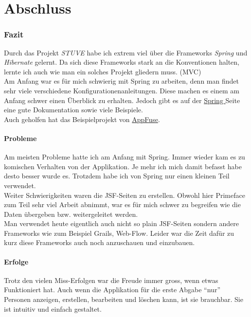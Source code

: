 \part{Abschluss}
\newpage
\section{Fazit}
Durch das Projekt \textit{STUVE} habe ich extrem viel über die Frameworks \textit{Spring} und \textit{Hibernate} gelernt. Da sich diese Frameworks stark an die Konventionen halten, lernte ich auch wie man ein solches Projekt gliedern muss. (MVC)\\[2ex]
Am Anfang war es für mich schwierig mit Spring zu arbeiten, denn man findet sehr viele verschiedene Konfigurationenanleitungen. Diese machen es einem am Anfang schwer einen Überblick zu erhalten. Jedoch gibt es auf der \href{http://www.springsource.org/}{Spring }Seite eine gute Dokumentation sowie viele Beispiele.\\
Auch geholfen hat das Beispielprojekt von \href{http://appfuse.org/display/APF/Home}{AppFuse}.\\
%
\subsection{Probleme}
Am meisten Probleme hatte ich am Anfang mit Spring. Immer wieder kam es zu komischen Verhalten von der Applikation. Je mehr ich mich damit befasst habe desto besser wurde es. Trotzdem habe ich von Spring nur einen kleinen Teil verwendet.\\
Weiter Schwierigkeiten waren die JSF-Seiten zu erstellen. Obwohl hier Primeface zum Teil sehr viel Arbeit abnimmt, war es für mich schwer zu begreifen wie die Daten übergeben bzw. weitergeleitet werden.\\
Man verwendet heute eigentlich auch nicht so plain JSF-Seiten sondern andere Frameworks wie zum Beispiel Grails, Web-Flow. Leider war die Zeit dafür zu kurz diese Frameworks auch noch anzuschauen und einzubauen.
%
\subsection{Erfolge}
Trotz den vielen Miss-Erfolgen war die Freude immer gross, wenn etwas Funktioniert hat. Auch wenn die Applikation für die erste Abgabe ``nur'' Personen anzeigen, erstellen, bearbeiten und löschen kann, ist sie brauchbar. Sie ist intuitiv und einfach gestaltet.


\newpage
